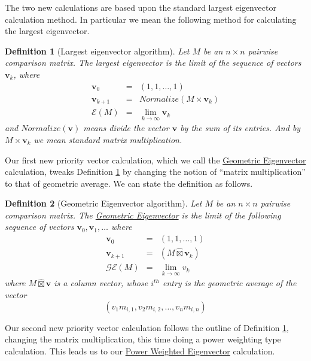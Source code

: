 \documentclass[11pt]{article}
\newtheorem{definition}{Definition}
\begin{document}
The two new calculations are based upon the standard largest eigenvector calculation
method. In particular we mean the following method for calculating the largest
eigenvector.

\begin{definition}[Largest eigenvector algorithm]
	\label{def:eigen}
	Let $M$ be an $n \times n$ pairwise comparison matrix. The 
	largest eigenvector is the limit of the
	sequence of vectors $\mathbf{v}_k$, where
	\begin{eqnarray*}
		\mathbf{v}_0 &=& (1, 1, \ldots, 1) \\
		\mathbf{v}_{k+1} &=& Normalize(M \times \mathbf{v}_k) \\
		\mathcal{E}(M) &=& \lim_{k \to \infty} \mathbf{v}_k
	\end{eqnarray*}
	and $Normalize(\mathbf{v})$ means divide the vector $\mathbf{v}$ by the sum of its entries.  And by $M \times \mathbf{v}_k$ we mean standard matrix multiplication.
\end{definition}

Our first new priority vector calculation, which we call the \ul{Geometric Eigenvector} 
calculation, tweaks Definition \ref{def:eigen} by changing the notion of ``matrix
multiplication'' to that of geometric average.  We can state the definition as follows.
\begin{definition}[Geometric Eigenvector algorithm]
	\label{def:geigen}
	Let $M$ be an $n \times n$ pairwise comparison matrix.  The 
	\ul{Geometric Eigenvector} is the limit of the following sequence of
	vectors $\mathbf{v}_0, \mathbf{v}_1, \ldots$ where
	\begin{eqnarray*}
		\mathbf{v}_0 &=& (1, 1, \ldots, 1) \\
		\mathbf{v}_{k+1} &=& (M \widehat{\boxtimes} \mathbf{v}_k) \\
		\mathcal{GE}(M) &=& \lim_{k\to \infty} v_k
	\end{eqnarray*}
	where $M \widehat{\boxtimes} \mathbf{v}$ is a column vector, whose $i^{th}$ entry
	is the geometric average of the vector
	$$\left(v_1 m_{i,1}, v_2 m_{i,2}, \ldots, v_n m_{i,n}\right)$$	
\end{definition}

Our second new priority vector calculation follows the outline of Definition 
\ref{def:eigen}, changing the matrix multiplication, this time doing
a power weighting type calculation.  This leads us to our \ul{Power Weighted Eigenvector} calculation.
\end{document}

